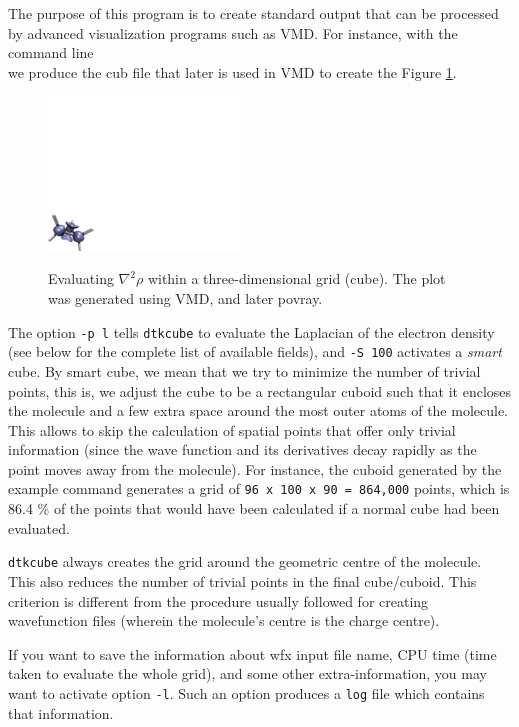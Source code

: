 The purpose of this program is to create standard output that can be processed by advanced visualization programs such as VMD. For instance, with the command line\\
we produce the cub file that later is used in VMD to create the Figure \ref{fig:dtkcubeuseex}.
%
\begin{figure}[hb!]
\centering
\includegraphics[width=0.45\textwidth]{cyclopLap}\label{fig:cyclopLap}
\caption{Evaluating $\nabla^2\rho$ within a three-dimensional grid (cube). The plot was generated using VMD, and later povray.}\label{fig:dtkcubeuseex}
\end{figure}
%
The option \texttt{-p l} tells \texttt{dtkcube} to evaluate the Laplacian of the electron density (see below for the complete list of available fields), and \texttt{-S 100} activates a \textit{smart} cube. By smart cube, we mean that we try to minimize the number of trivial points, this is, we adjust the cube to be a rectangular cuboid such that it encloses the molecule and a few extra space around the most outer atoms of the molecule. This allows \DTK{} to skip the calculation of spatial points that offer only trivial information (since the wave function and its derivatives decay rapidly as the point moves away from the molecule). For instance, the cuboid generated by the example command generates a grid of \texttt{96 x 100 x 90 = 864,000} points, which is 86.4 \% of the points that would have been calculated if a normal cube had been evaluated.

\texttt{dtkcube} always creates the grid around the geometric centre of the molecule. This also reduces the number of trivial points in the final cube/cuboid. This criterion is different from
the procedure usually followed for creating wavefunction files (wherein the molecule's centre
is the charge centre).

If you want to save the information about wfx input file name, CPU time (time taken to evaluate the whole grid), and some other extra-information, you may want to activate option \texttt{-l}.
Such an option produces a \texttt{log} file which contains that information.

